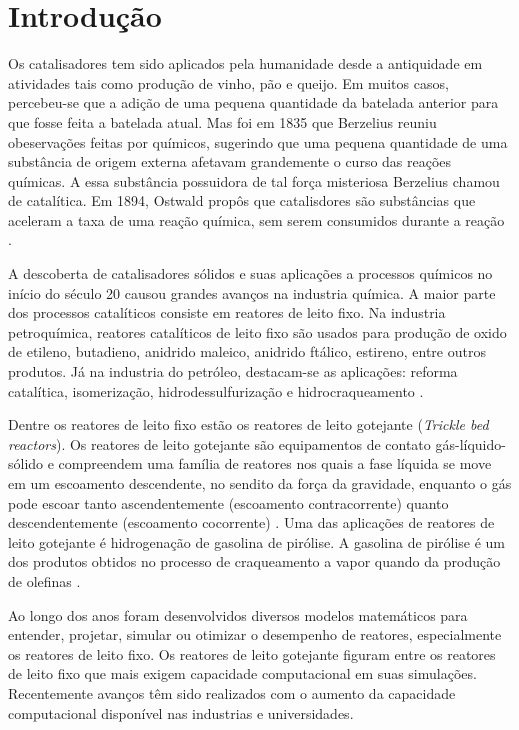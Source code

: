 %
% 
%
\chapter{Introdução} \label{chap:introduction}
Os catalisadores tem sido aplicados pela humanidade desde a antiquidade
em atividades tais como produção de vinho, pão e queijo. Em muitos
casos, percebeu-se que a adição de uma pequena quantidade da batelada anterior
para que fosse feita a batelada atual. Mas foi em 1835 que Berzelius reuniu
obeservações feitas por químicos, sugerindo que uma pequena quantidade de
uma substância de origem externa afetavam grandemente o
curso das reações químicas. A essa substância possuidora de tal força
misteriosa Berzelius chamou de catalítica. Em 1894, Ostwald propôs que
catalisdores são substâncias que aceleram a taxa de uma reação química, sem
serem consumidos durante a reação \cite{Oyama1988}.

A descoberta de catalisadores sólidos e suas aplicações a processos químicos no
início do século 20 causou grandes avanços na industria química. A maior parte
dos processos catalíticos consiste em reatores de leito fixo. Na industria
petroquímica, reatores catalíticos de leito fixo são usados para produção de
oxido de etileno, butadieno, anidrido maleico, anidrido ftálico, estireno,
entre outros produtos. Já na industria do petróleo, destacam-se as aplicações:
reforma catalítica, isomerização, hidrodessulfurização e hidrocraqueamento
\cite{Froment2011}.

Dentre os reatores de leito fixo estão os reatores de leito gotejante
(\emph{Trickle bed reactors}). Os reatores de leito gotejante são
equipamentos de contato gás-líquido-sólido e compreendem uma família de
reatores nos quais a fase líquida se move em um escoamento descendente, no
sendito da força da gravidade, enquanto o gás pode escoar tanto ascendentemente
(escoamento contracorrente) quanto descendentemente (escoamento cocorrente)
\cite{Ranade2011}. Uma das aplicações de reatores de leito gotejante é
hidrogenação de gasolina de pirólise. A gasolina de pirólise é um dos produtos obtidos no processo de
craqueamento a vapor quando da produção de olefinas \cite{Cheng1986}.

Ao longo dos anos foram desenvolvidos diversos modelos matemáticos para
entender, projetar, simular ou otimizar o desempenho de reatores, especialmente
os reatores de leito fixo. Os reatores de leito gotejante figuram entre os
reatores de leito fixo que mais exigem capacidade computacional em suas
simulações. Recentemente avanços têm sido realizados com o aumento da capacidade
computacional disponível nas industrias e universidades.

